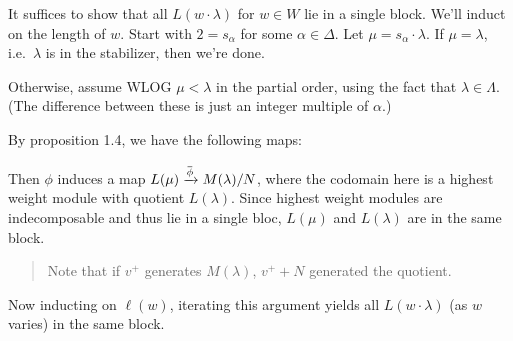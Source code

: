 \documentclass[11pt]{scrartcl}
\theoremstyle{definition}
\theoremstyle{theorem}
\theoremstyle{proof}
\newenvironment{proof}
{\pushQED{$\qed$}\pf}
{\par\popQED\endpf}
\theoremstyle{definition}
\theoremstyle{break}
\theoremstyle{problem}
\newcommand{\mapsvia}[1]{\xrightarrow{#1}}
\renewcommand{\bar}[1]{\mkern 1.5mu\overline{\mkern-1.5mu#1\mkern-1.5mu}\mkern 1.5mu}
\renewcommand{\qed}[0]{\hfill\blacksquare}
\begin{document}
\begin{proof}

It suffices to show that all \(L(w\cdot \lambda)\) for \(w\in W\) lie in
a single block. We'll induct on the length of \(w\). Start with
\(2 = s_\alpha\) for some \(\alpha\in \Delta\). Let
\(\mu = s_\alpha \cdot \lambda\). If \(\mu = \lambda\), i.e.~\(\lambda\)
is in the stabilizer, then we're done.

Otherwise, assume WLOG \(\mu < \lambda\) in the partial order, using the
fact that \(\lambda \in \Lambda\). (The difference between these is just
an integer multiple of \(\alpha\).)

By proposition 1.4, we have the following maps:

\begin{center}
\end{center}

Then \(\phi\) induces a map \(L(\mu) \mapsvia{\bar \phi} M(\lambda)/N\),
where the codomain here is a highest weight module with quotient
\(L(\lambda)\). Since highest weight modules are indecomposable and thus
lie in a single bloc, \(L(\mu)\) and \(L(\lambda)\) are in the same
block.

\begin{quote}
Note that if \(v^+\) generates \(M(\lambda)\), \(v^+ + N\) generated the
quotient.
\end{quote}

Now inducting on \(\ell(w)\), iterating this argument yields all
\(L(w\cdot \lambda)\) (as \(w\) varies) in the same block.\end{proof}
\end{document}
